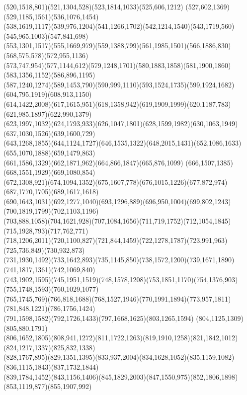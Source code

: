 \documentclass[a4paper,twopage,reqno,12pt]{amsart}
\theoremstyle{definition}
\numberwithin{equation}{section}
\begin{document}
\begin{enumerate}
{{(520,1518,801)(521,1304,528)(523,1814,1033)(525,606,1212)
(527,602,1369)(529,1185,1561)(536,1076,1454)\\
(538,1619,1117)(539,976,1204)(541,1266,1702)(542,1214,1540)(543,1719,560)(545,965,1003)(547,841,698)\\
(553,1301,1517)(555,1669,979)(559,1388,799)(561,1985,1501)(566,1886,830)(568,575,578)(572,955,1136)\\
(573,747,954)(577,1144,612)(579,1248,1701)(580,1883,1858)(581,1900,1860)(583,1356,1152)(586,896,1195)\\
(587,1240,1274)(589,1453,790)(590,999,1110)(593,1524,1735)(599,1924,1682)(604,795,1919)(608,913,1150)\\
(614,1422,2008)(617,1615,951)(618,1358,942)(619,1909,1999)(620,1187,783)(621,985,1897)(622,990,1379)\\
(623,1997,1032)(624,1793,933)(626,1047,1801)(628,1599,1982)(630,1063,1949)(637,1030,1526)(639,1600,729)\\
(643,1268,1855)(644,1124,1727)(646,1535,1322)(648,2015,1431)(652,1086,1633)(655,1070,1888)(659,1479,863)\\
(661,1586,1329)(662,1871,962)(664,866,1847)(665,876,1099)
(666,1507,1385)(668,1551,1929)(669,1080,854)\\
(672,1308,921)(674,1094,1352)(675,1607,778)(676,1015,1226)(677,872,974)(687,1770,1705)(689,1617,1618)\\
(690,1643,1031)(692,1277,1040)(693,1296,889)(696,950,1004)(699,802,1243)(700,1819,1799)(702,1103,1196)\\
(703,888,1058)(704,1621,928)(707,1084,1656)(711,719,1752)(712,1054,1845)(715,1928,793)(717,762,771)\\
(718,1206,2011)(720,1100,827)(721,844,1459)(722,1278,1787)(723,991,963)(725,736,849)(730,932,873)\\
(731,1930,1492)(733,1642,893)(735,1145,850)(738,1572,1200)(739,1671,1890)(741,1817,1361)(742,1069,840)\\
(743,1902,1595)(745,1951,1519)(748,1578,1208)(753,1851,1170)(754,1376,903)(755,1748,1593)(760,1029,1077)\\
(765,1745,769)(766,818,1688)(768,1527,1946)(770,1991,1894)(773,957,1811)(781,848,1221)(786,1756,1424)\\
(791,1598,1582)(792,1726,1433)(797,1668,1625)(803,1265,1594)
(804,1125,1309)(805,880,1791)\\
(806,1652,1805)(808,941,1272)(811,1722,1263)(819,1910,1258)(821,1842,1012)(824,1217,1337)(825,832,1338)\\
(828,1767,895)(829,1351,1395)(833,937,2004)(834,1628,1052)(835,1159,1082)(836,1115,1843)(837,1732,1844)\\(839,1784,1452)(843,1156,1406)(845,1829,2003)(847,1550,975)(852,1806,1898)(853,1119,877)(855,1907,992)\\
}}
\end{enumerate}
\end{document}
